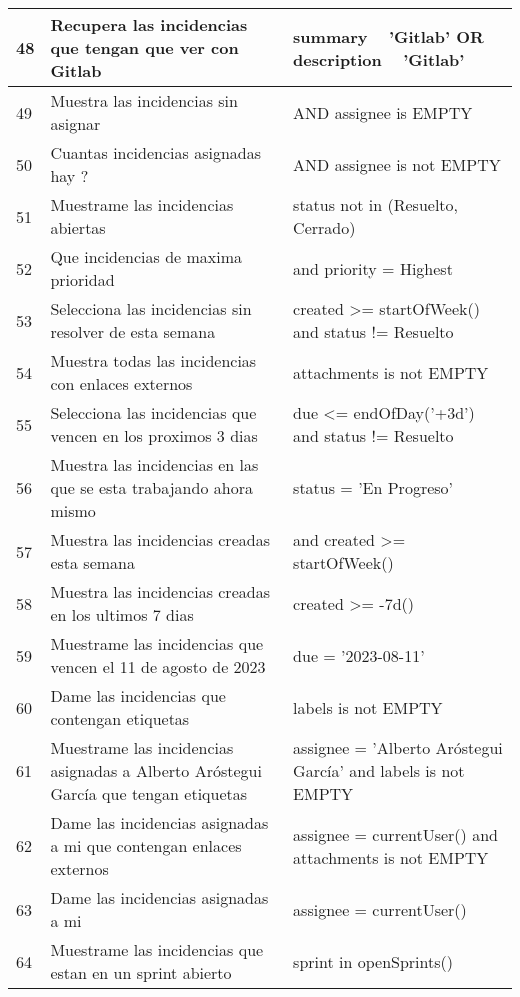 \begin{center}
\begin{longtable}{ | p{1cm} | p{8cm} | p{6cm} | }
        \hline
        48 & Recupera las incidencias que tengan que ver con Gitlab  & summary ~ 'Gitlab' OR description ~ 'Gitlab'    \\
        \hline
        49 & Muestra las incidencias sin asignar  &  AND assignee is EMPTY \\
        \hline
        50 & Cuantas incidencias asignadas hay ? &  AND assignee is not EMPTY \\
        \hline
        51 & Muestrame las incidencias abiertas  & status not in (Resuelto, Cerrado)   \\
        \hline
        52 & Que incidencias de maxima prioridad  &  and priority = Highest \\
        \hline
        53 & Selecciona las incidencias sin resolver de esta semana  & created >= startOfWeek() and status != Resuelto   \\
        \hline
        54 & Muestra todas las incidencias con enlaces externos  & attachments is not EMPTY \\
        \hline
        55 & Selecciona las incidencias que vencen en los proximos 3 dias  & due <= endOfDay('+3d') and status != Resuelto   \\
        \hline
        56 & Muestra las incidencias en las que se esta trabajando ahora mismo  & status = 'En Progreso'   \\
        \hline
        57 & Muestra las incidencias creadas esta semana  &  and created >= startOfWeek() \\
        \hline
        58 & Muestra las incidencias creadas en los ultimos 7 dias  & created >= -7d()  \\
        \hline
        59 & Muestrame las incidencias que vencen el 11 de agosto de 2023  & due = '2023-08-11' \\
        \hline
        60 & Dame las incidencias que contengan etiquetas &  labels is not EMPTY \\
        \hline
        61 & Muestrame las incidencias asignadas a Alberto Aróstegui García que tengan etiquetas  & assignee = 'Alberto Aróstegui García' and labels is not EMPTY   \\
        \hline
        62 & Dame las incidencias asignadas a mi  que contengan enlaces externos & assignee = currentUser() and attachments is not EMPTY \\
        \hline
        63 & Dame las incidencias asignadas a mi  & assignee = currentUser() \\
        \hline
        64 & Muestrame las incidencias que estan en un sprint abierto & sprint in openSprints() \\

\end{longtable}
\end{center}
